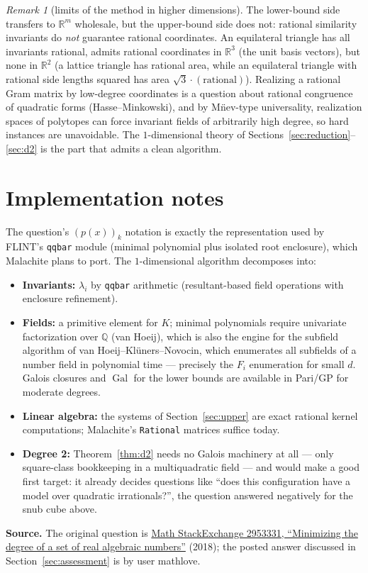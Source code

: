 \documentclass[11pt]{article}
\theoremstyle{definition}
\theoremstyle{remark}
\newtheorem{remark}[theorem]{Remark}
\newcommand{\Q}{\mathbb{Q}}
\newcommand{\R}{\mathbb{R}}
\newcommand{\Gal}{\operatorname{Gal}}
\begin{document}
\begin{remark}[limits of the method in higher dimensions]
The lower-bound side transfers to $\R^m$ wholesale, but the upper-bound side does not: rational
similarity invariants do \emph{not} guarantee rational coordinates. An equilateral triangle
has all invariants rational, admits rational coordinates in $\R^3$ (the unit basis vectors),
but none in $\R^2$ (a lattice triangle has rational area, while an equilateral triangle with
rational side lengths squared has area $\sqrt3 \cdot (\text{rational})$). Realizing a rational
Gram matrix by low-degree coordinates is a question about rational congruence of quadratic
forms (Hasse--Minkowski), and by M\"nev-type universality, realization spaces of polytopes can
force invariant fields of arbitrarily high degree, so hard instances are unavoidable. The
$1$-dimensional theory of Sections~\ref{sec:reduction}--\ref{sec:d2} is the part that admits a
clean algorithm.
\end{remark}

\section{Implementation notes}\label{sec:impl}

The question's $(p(x))_k$ notation is exactly the representation used by FLINT's
\texttt{qqbar} module (minimal polynomial plus isolated root enclosure), which Malachite plans
to port. The $1$-dimensional algorithm decomposes into:

\begin{itemize}
\item \textbf{Invariants:} $\lambda_i$ by \texttt{qqbar} arithmetic (resultant-based field
operations with enclosure refinement).
\item \textbf{Fields:} a primitive element for $K$; minimal polynomials require univariate
factorization over $\Q$ (van Hoeij), which is also the engine for the subfield algorithm of
van Hoeij--Kl\"uners--Novocin, which enumerates all subfields of a number field in polynomial
time --- precisely the $F_i$ enumeration for small $d$. Galois closures and $\Gal$ for the
lower bounds are available in Pari/GP for moderate degrees.
\item \textbf{Linear algebra:} the systems of Section~\ref{sec:upper} are exact rational
kernel computations; Malachite's \texttt{Rational} matrices suffice today.
\item \textbf{Degree 2:} Theorem~\ref{thm:d2} needs no Galois machinery at all --- only
square-class bookkeeping in a multiquadratic field --- and would make a good first target: it
already decides questions like ``does this configuration have a model over quadratic
irrationals?'', the question answered negatively for the snub cube above.
\end{itemize}

\medskip
\noindent\textbf{Source.} The original question is
\href{https://math.stackexchange.com/questions/2953331}{Math StackExchange 2953331,
``Minimizing the degree of a set of real algebraic numbers''} (2018); the posted answer
discussed in Section~\ref{sec:assessment} is by user mathlove.
\end{document}
